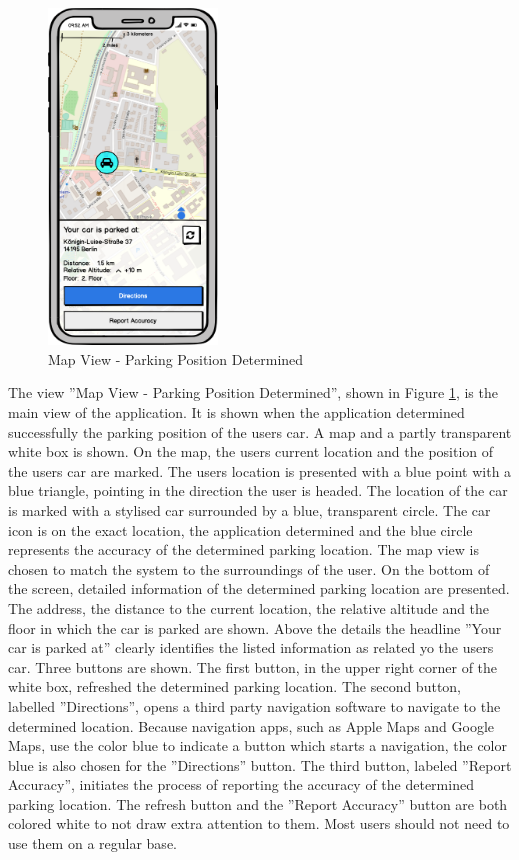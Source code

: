 \begin{figure}[h]
    \centering
    \includegraphics[width=0.4\textwidth]{images/UI/Iteration4-MapView-ParkingPositionDetermined.png}
    \caption{Map View - Parking Position Determined}
    \label{fig:mv-parking}
\end{figure}

The view ''Map View - Parking Position Determined'', shown in Figure \ref{fig:mv-parking}, is the main view of the application. It is shown when the application determined successfully the parking position of the users car. A map and a partly transparent white box is shown. On the map, the users current location and the position of the users car are marked. The users location is presented with a blue point with a blue triangle, pointing in the direction the user is headed. The location of the car is marked with a stylised car surrounded by a blue, transparent circle. The car icon is on the exact location, the application determined and the blue circle represents the accuracy of the determined parking location. The map view is chosen to match the system to the surroundings of the user. On the bottom of the screen, detailed information of the determined parking location are presented. The address, the distance to the current location, the relative altitude and the floor in which the car is parked are shown. Above the details the headline ''Your car is parked at'' clearly identifies the listed information as related yo the users car. Three buttons are shown. The first button, in the upper right corner of the white box, refreshed the determined parking location. The second button, labelled ''Directions'', opens a third party navigation software to navigate to the determined location. Because navigation apps, such as Apple Maps and Google Maps, use the color blue to indicate a button which starts a navigation, the color blue is also chosen for the ''Directions'' button. The third button, labeled ''Report Accuracy'', initiates the process of reporting the accuracy of the determined parking location. The refresh button and the ''Report Accuracy'' button are both colored white to not draw extra attention to them. Most users should not need to use them on a regular base. \cite{nielsen1994usability}


